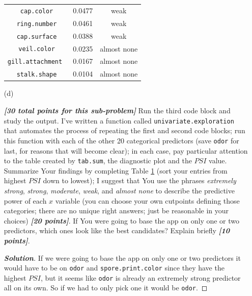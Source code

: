 \documentclass[12pt]{article}
\newenvironment{solution}{\begin{tcolorbox}[breakable]\begin{proof}[\textbf{\textit{Solution}}] }{\end{proof}\end{tcolorbox}}
\newcommand{\bi}[1]{\textbf{\textit{#1}}}
\begin{document}
\begin{itemize}
\begin{table}[t!]
\begin{tabular}{c|cc}
\texttt{cap.color} & 0.0477 & weak \\

\texttt{ring.number} & 0.0461 & weak \\ 

\texttt{cap.surface} & 0.0388 & weak \\

\texttt{veil.color} & 0.0235 & almost none  \\ 

\texttt{gill.attachment } & 0.0167 & almost none \\

\texttt{stalk.shape} & 0.0104 & almost none \\

\end{tabular}

\label{t:summary-table-1}

\end{table}

\item[(d)]

\bi{[30 total points for this sub-problem]} Run the third code block and study the output. I've written a function called \texttt{univariate.exploration} that automates the process of repeating the first and second code blocks; run this function with each of the other 20 categorical predictors (save \texttt{odor} for last, for reasons that will become clear); in each case, pay particular attention to the table created by \texttt{tab.sum}, the diagnostic plot and the $PSI$ value. Summarize Your findings by completing Table \ref{t:summary-table-1} (sort your entries from highest $PSI$ down to lowest); I suggest that You use the phrases \textit{extremely strong}, \textit{strong}, \textit{moderate}, \textit{weak}, and \textit{almost none} to describe the predictive power of each $x$ variable (you can choose your own cutpoints defining those categories; there are no unique right answers; just be reasonable in your choices) \bi{[20 points]}. If You were going to base the app on only one or two predictors, which ones look like the best candidates? Explain briefly \bi{[10 points]}.

\begin{solution}
    If we were going to base the app on only one or two predictors it would have to be on \texttt{odor} and \texttt{spore.print.color} since they have the highest $PSI$, but it seems like \texttt{odor} is already an extremely strong predictor all on its own. So if we had to only pick one it would be \texttt{odor}. 
\end{solution}


\end{itemize}
\end{document}
